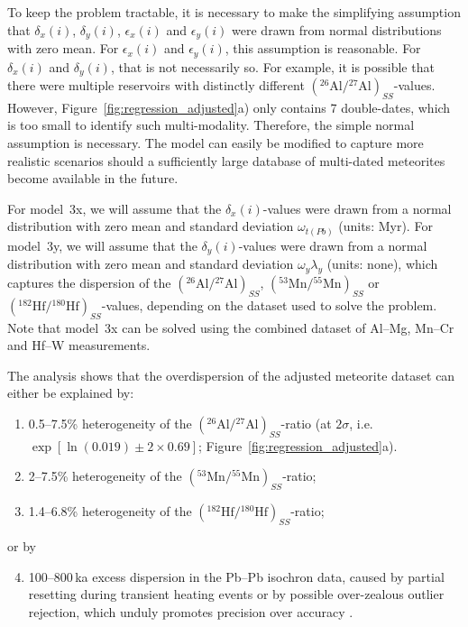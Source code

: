 \documentclass{article}
\begin{document}
To keep the problem tractable, it is necessary to make the simplifying
assumption that $\delta_x(i)$, $\delta_y(i)$, $\epsilon_x(i)$ and
$\epsilon_y(i)$ were drawn from normal distributions with zero mean.
For $\epsilon_x(i)$ and $\epsilon_y(i)$, this assumption is
reasonable. For $\delta_x(i)$ and $\delta_y(i)$, that is not
necessarily so. For example, it is possible that there were multiple
reservoirs with distinctly different
$({}^{26}\mbox{Al}/{}^{27}\mbox{Al})_{\mathit{SS}}$-values. However,
Figure~\ref{fig:regression_adjusted}a) only contains 7 double-dates,
which is too small to identify such multi-modality. Therefore, the
simple normal assumption is necessary. The model can easily be
modified to capture more realistic scenarios should a sufficiently
large database of multi-dated meteorites become available in the
future.\medskip

For model~3x, we will assume that the $\delta_x(i)$-values were drawn
from a normal distribution with zero mean and standard deviation
$\omega_{\mathit{t(Pb)}}$ (units: Myr). For model~3y, we will assume
that the $\delta_y(i)$-values were drawn from a normal distribution
with zero mean and standard deviation $\omega_y\lambda_y$ (units:
none), which captures the dispersion of the
$({}^{26}\mbox{Al}/{}^{27}\mbox{Al})_{\mathit{SS}}$,
$({}^{53}\mbox{Mn}/{}^{55}\mbox{Mn})_{\mathit{SS}}$ or
$({}^{182}\mbox{Hf}/{}^{180}\mbox{Hf})_{\mathit{SS}}$-values,
depending on the dataset used to solve the problem. Note that model~3x
can be solved using the combined dataset of Al--Mg, Mn--Cr and Hf--W
measurements.\medskip

The analysis shows that the overdispersion of the adjusted meteorite
dataset can either be explained by:
\begin{enumerate}
\item 0.5--7.5\% heterogeneity of the
  $({}^{26}\mbox{Al}/{}^{27}\mbox{Al})_{\mathit{SS}}$-ratio (at $2\sigma$,
  i.e. $\exp[\ln(0.019)\pm{2\times0.69}]$;
  Figure~\ref{fig:regression_adjusted}a).
\item 2--7.5\% heterogeneity of the 
  $({}^{53}\mbox{Mn}/{}^{55}\mbox{Mn})_{\mathit{SS}}$-ratio;
\item 1.4--6.8\% heterogeneity of the
  $({}^{182}\mbox{Hf}/{}^{180}\mbox{Hf})_{\mathit{SS}}$-ratio;
\end{enumerate}

or by

\begin{enumerate}
  \setcounter{enumi}{3}
\item 100--800\,ka excess dispersion in the Pb--Pb isochron data,
  caused by partial resetting during transient heating events
  \citep{desch2023a} or by possible over-zealous outlier rejection,
  which unduly promotes precision over accuracy
  \citep{vermeesch2026f}.
\end{enumerate}
\end{document}
